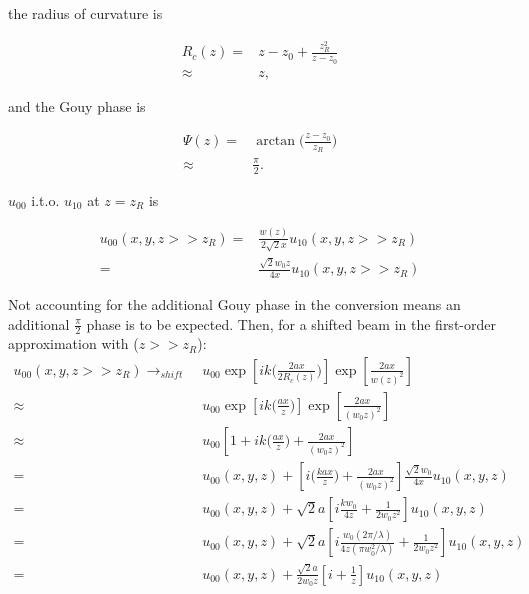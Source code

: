 \documentclass[aps,twoside,secnumarabic,balancelastpage,amsmath,amssymb,nofootinbib,hyperref=pdftex]{revtex4}
\newcommand{\bigfrac}[2]{\Big( \frac{#1}{#2}\Big)}
\begin{document}
the radius of curvature is 

\begin{align*}
	R_c (z) =& 
	z-z_0 + \frac{z_R^2}{z-z_0}
	\\ \approx &
	z ,
\end{align*}

and the Gouy phase is 

\begin{align*}
\Psi(z)
 =& \arctan\Big( \frac{z-z_0}{z_R} \Big)
 \\ \approx & \frac{\pi}{2}.
\end{align*}


$u_{00}$ i.t.o. $u_{10}$ at $z=z_R$ is 

\begin{align*}
u_{00}(x,y,z>> z_R) =&
 	\frac{ w(z)}{2\sqrt{2} x} 
 u_{10}(x,y,z>>z_R) 	
 	\\=&
 	\frac{\sqrt{2} w_0 z}{4x} 
 	u_{10} (x,y,z>> z_R) 
\end{align*}


Not accounting for the additional Gouy phase in the conversion means an additional $\frac{\pi}{2}$ phase is to be expected. Then, for a shifted beam in the first-order approximation with ($z>>z_R$):
	\begin{align*}
		u_{00} (x,y,z>>z_R)
			\rightarrow_{shift} \; & u_{00} \exp 
			\left[ 
				ik \bigfrac{2 a x }{2 R_c(z)} 
			\right] 
			\exp 
			\left[ 
				\frac{2ax}{w(z)^2}
			\right]
		\nonumber\\ 
		\approx & u_{00} \exp 
			\left[ 
				ik \bigfrac{a x }{z} 
			\right] 
		\exp 
			\left[ 
				\frac{2ax}{ (w_0 z)^2}
			\right]		
		\nonumber\\ 
			\approx & u_{00} 
			\left[
				1 + ik \bigfrac{a x}{z} 
				+ \frac{2ax}{ (w_0 z)^2}
			\right]
			\nonumber\\
			= & 
			u_{00} (x,y,z)
			+ 
			\left[
				i\bigfrac{k a x}{z} 
				+ \frac{2 ax}{ (w_0 z)^2}
			\right]
			\frac{\sqrt{2} w_0}{4x} 
			u_{10} (x,y,z)
			\nonumber\\						
			= & 
			u_{00}(x,y,z) +
			\sqrt{2} a
			 \left[
			 i  \frac{k w_0}{4z}
			 +
			 \frac{1}{2 w_0 z^2}
			\right]
			 u_{10}(x,y,z)
			 \nonumber\\
			 			= & 
			u_{00}(x,y,z) +
			\sqrt{2} a
			 \left[
			 i  \frac{ w_0 (2\pi / \lambda )}
			 {4z (\pi w_0^2  /\lambda)}
			 +
			 \frac{1}{2 w_0 z^2}
			\right]
			 u_{10}(x,y,z)
			 \nonumber\\
			 			 			= & 
			u_{00}(x,y,z) +
			\frac{\sqrt{2} a}{2 w_0z} 
			 \left[
			 i 
			 +
			 \frac{1}{z}
			\right]
			 u_{10}(x,y,z)
	\end{align*}
\end{document}
